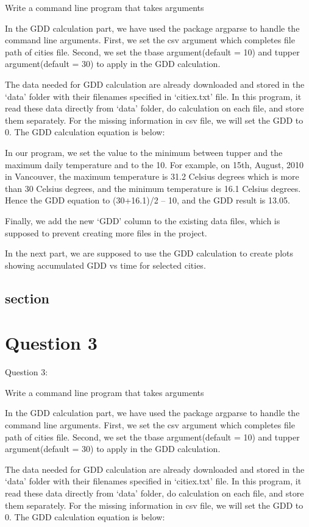 \documentclass[12pt,letterpaper]{article}
\begin{document}
Write a command line program that takes arguments

In the GDD calculation part, we have used the package argparse to handle the command line arguments. First, we set the csv argument which completes file path of cities file. Second, we set the tbase argument(default = 10) and tupper argument(default = 30) to apply in the GDD calculation. 

The data needed for GDD calculation are already downloaded and stored in the ‘data’ folder with their filenames specified in ‘citiex.txt’ file. In this program, it read these data directly from ‘data’ folder, do calculation on each file, and store them separately. For the missing information in csv file, we will set the GDD to 0. The GDD calculation equation is below:


In our program, we set the  value to the minimum between tupper and the maximum daily temperature and  to the 10. For example, on 15th, August, 2010 in Vancouver, the maximum temperature is 31.2 Celsius degrees which is more than 30 Celsius degrees, and the minimum temperature is 16.1 Celsius degrees. Hence the GDD equation to (30+16.1)/2 – 10, and the GDD result is 13.05.

Finally, we add the new ‘GDD’ column to the existing data files, which is supposed to prevent creating more files in the project.

In the next part, we are supposed to use the GDD calculation to create plots showing accumulated GDD vs time for selected cities.
\subsection{ section}

\section{Question 3}
Question 3:

Write a command line program that takes arguments

In the GDD calculation part, we have used the package argparse to handle the command line arguments. First, we set the csv argument which completes file path of cities file. Second, we set the tbase argument(default = 10) and tupper argument(default = 30) to apply in the GDD calculation. 

The data needed for GDD calculation are already downloaded and stored in the ‘data’ folder with their filenames specified in ‘citiex.txt’ file. In this program, it read these data directly from ‘data’ folder, do calculation on each file, and store them separately. For the missing information in csv file, we will set the GDD to 0. The GDD calculation equation is below:
\end{document}
